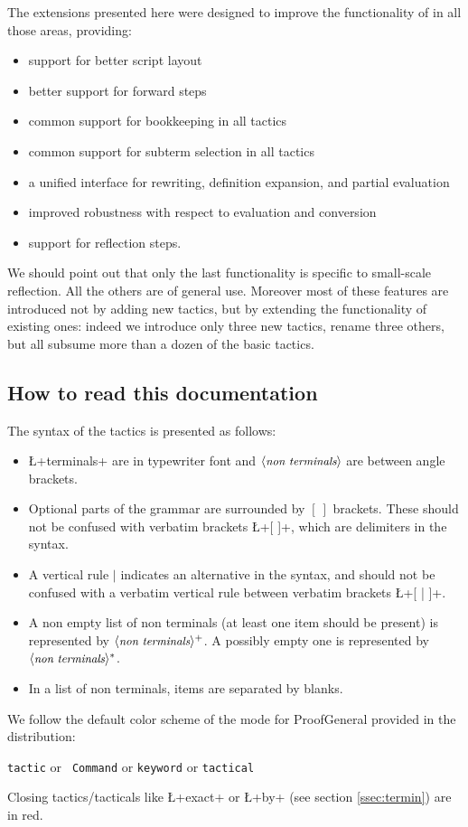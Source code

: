 The extensions presented here were designed to improve the
functionality of \Coq{} in all those areas, providing:

\begin{itemize}
\item support for better script layout
\item better support for forward steps
\item common
support for bookkeeping in all tactics
\item common support for subterm
selection in all tactics
\item a unified interface for rewriting,
definition expansion, and partial evaluation
\item improved robustness
with respect to evaluation and conversion
\item support for reflection
steps.
\end{itemize}
 We should point out that only the last functionality is specific
to small-scale reflection. All the others are of general use.
Moreover most of these features are introduced not
by adding new tactics, but by extending the functionality of existing
ones: indeed we introduce only three new tactics, rename three others,
but all subsume more than a dozen of the basic \Coq{} tactics.


\subsection*{How to read this documentation}


The syntax of the tactics is presented as follows:
\begin{itemize}
\item \L+terminals+ are in typewriter font and $\langle\mbox{\itshape\rmfamily\small non terminals}\rangle$ are
  between angle brackets.
\item Optional parts of the grammar are surrounded by $[\ ]$
  brackets. These should not be confused with verbatim brackets 
  \L+[ ]+, which are delimiters in the \ssr{} syntax.
\item A vertical rule $|$ indicates an alternative in the syntax, and
  should not be confused with a
  verbatim vertical rule between verbatim brackets \L+[ | ]+.
\item A non empty list of non terminals (at least one item should be
  present) is represented by $\langle\mbox{\itshape\rmfamily\small non terminals}\rangle^+$. A possibly empty
  one is represented by $\langle\mbox{\itshape\rmfamily\small non terminals}\rangle^*$.
\item In a list of non terminals, items are separated by blanks.
\end{itemize}


\noindent We follow the default color scheme of the \ssr{} mode for
ProofGeneral provided in the distribution:

\centerline{
\textcolor{dkblue}{\texttt{tactic}} or \textcolor{dkviolet}{\tt
  Command} or \textcolor{dkgreen}{\tt keyword} or
\textcolor{dkpink}{\tt tactical}}

\noindent Closing tactics/tacticals like \L+exact+ or \L+by+ (see section
\ref{ssec:termin}) are in red.

\newpage